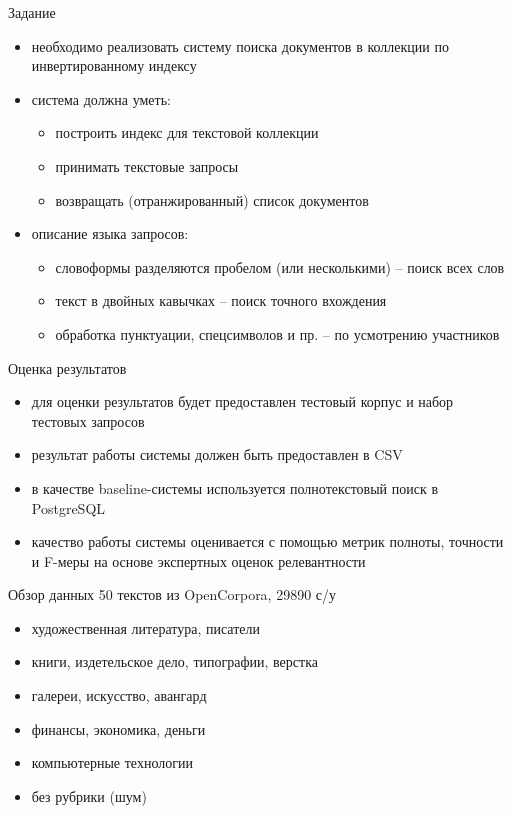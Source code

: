 \documentclass{beamer}
\begin{document}
\begin{frame}{Задание}
\begin{itemize}
	\item необходимо реализовать систему поиска документов в коллекции по инвертированному индексу
    \item система должна уметь:
        \begin{itemize}
            \item построить индекс для текстовой коллекции
            \item принимать текстовые запросы
            \item возвращать (отранжированный) список документов
        \end{itemize}
    \item описание языка запросов:
       \begin{itemize}
            \item словоформы разделяются пробелом (или несколькими) -- поиск всех слов
            \item текст в двойных кавычках -- поиск точного вхождения
            \item обработка пунктуации, спецсимволов и пр. -- по усмотрению участников
        \end{itemize}    
\end{itemize}
\end{frame}

\begin{frame}{Оценка результатов}
\begin{itemize}
	\item для оценки результатов будет предоставлен тестовый корпус и набор тестовых запросов
    \item результат работы системы должен быть предоставлен в CSV
    \item в качестве baseline-системы используется полнотекстовый поиск в PostgreSQL
    \item качество работы системы оценивается с помощью метрик полноты, точности и F-меры на основе экспертных оценок релевантности 
\end{itemize}
\end{frame}

\begin{frame}{Обзор данных}
50 текстов из OpenCorpora, 29890 с/у\\
\bigskip
\begin{itemize}
    \item художественная литература, писатели
    \item книги, издетельское дело, типографии, верстка
    \item галереи, искусство, авангард
    \item финансы, экономика, деньги
    \item компьютерные технологии
    \item без рубрики (шум)
\end{itemize}
\end{frame}
\end{document}
